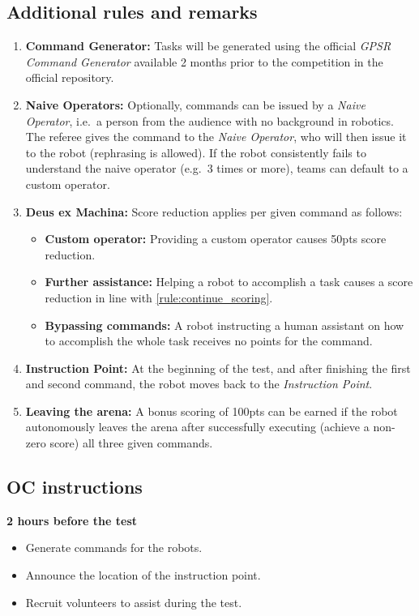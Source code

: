 \subsection*{Additional rules and remarks}
\begin{enumerate}[nosep]
	\item \textbf{Command Generator:} Tasks will be generated using the official \emph{GPSR Command Generator} available 2 months prior to the competition in the official repository.

	\item \textbf{Naive Operators:} Optionally, commands can be issued by a \emph{Naive Operator}, i.e.~a person from the audience with no background in robotics. The referee gives the command to the \emph{Naive Operator}, who will then issue it to the robot (rephrasing is allowed). If the robot consistently fails to understand the naive operator (e.g.~3 times or more), teams can default to a custom operator.

	\item \textbf{Deus ex Machina:} Score reduction applies per given command as follows:
	\begin{itemize}[nosep]
	\item \textbf{Custom operator:} Providing a custom operator causes 50pts score reduction.
	\item \textbf{Further assistance:} Helping a robot to accomplish a task causes a score reduction in line with \ref{rule:continue_scoring}.
	\item \textbf{Bypassing commands:} A robot instructing a human assistant on how to accomplish the whole task receives no points for the command.
	\end{itemize}

	\item \textbf{Instruction Point:} At the beginning of the test, and after finishing the first and second command, the robot moves back to the \textit{Instruction Point}.

	\item \textbf{Leaving the arena:} A bonus scoring of 100pts can be earned if the robot autonomously leaves the arena after successfully  executing (achieve a non-zero score) all three given commands.
\end{enumerate}

\subsection*{OC instructions}
\textbf{2 hours before the test}
\begin{itemize}[nosep]
	\item Generate commands for the robots.
	\item Announce the location of the instruction point.
	\item Recruit volunteers to assist during the test.
\end{itemize}

